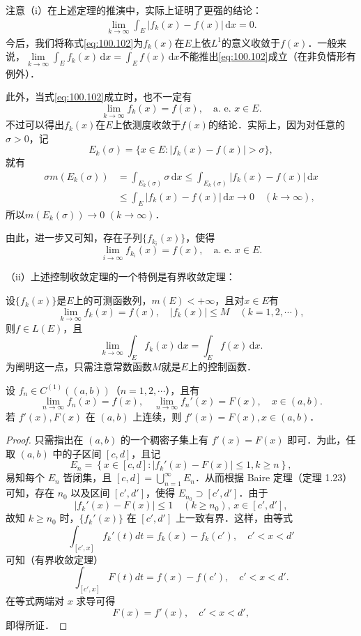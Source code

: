 \documentclass[../../main.tex]{subfiles}
\begin{document}
\begin{remark}
注意（i）在上述定理的推演中，实际上证明了更强的结论：
\begin{align}
\lim_{k \to \infty} \int_E |f_k(x) - f(x)| \, \mathrm{d}x = 0. \label{eq:100.102}
\end{align}
今后，我们将称式\eqref{eq:100.102}为\(f_k(x)\)在\(E\)上依\(L^1\)的意义收敛于\(f(x)\)．一般来说，$\underset{k\rightarrow \infty}{\lim}\int_E{f_k(x)\,\mathrm{d}x}=\int_E{f(x)\,\mathrm{d}x}$不能推出\eqref{eq:100.102}成立（在非负情形有例外）．

此外，当式\eqref{eq:100.102}成立时，也不一定有
\[
\lim_{k \to \infty} f_k(x) = f(x), \quad \text{a. e. } x \in E.
\]
不过可以得出\(f_k(x)\)在\(E\)上依测度收敛于\(f(x)\)的结论．实际上，因为对任意的\(\sigma > 0\)，记
\[
E_k(\sigma) = \{ x \in E : |f_k(x) - f(x)| > \sigma \},
\]
就有
\begin{align*}
\sigma m(E_k(\sigma)) &= \int_{E_k(\sigma)} \sigma \, \mathrm{d}x \leqslant \int_{E_k(\sigma)} |f_k(x) - f(x)| \, \mathrm{d}x \\
&\leqslant \int_E |f_k(x) - f(x)| \, \mathrm{d}x \to 0 \quad (k \to \infty),
\end{align*}
所以\(m(E_k(\sigma)) \to 0\) \((k \to \infty)\)．

由此，进一步又可知，存在子列\(\{ f_{k_i}(x) \}\)，使得
\[
\lim_{i \to \infty} f_{k_i}(x) = f(x), \quad \text{a. e. } x \in E.
\]

（ii）上述控制收敛定理的一个特例是有界收敛定理：

设\(\{ f_k(x) \}\)是\(E\)上的可测函数列，\(m(E) < +\infty\)，且对\(x \in E\)有
\[
\lim_{k \to \infty} f_k(x) = f(x), \quad |f_k(x)| \leqslant M \quad (k = 1, 2, \cdots),
\]
则\(f \in L(E)\)，且
\[
\lim_{k \to \infty} \int_E f_k(x) \, \mathrm{d}x = \int_E f(x) \, \mathrm{d}x.
\]
为阐明这一点，只需注意常数函数\(M\)就是\(E\)上的控制函数．
\end{remark}

\begin{example}
设 \( f_n \in C^{(1)}((a,b)) \)（\( n = 1,2,\cdots \)），且有
\[
\lim_{n \to \infty} f_n(x) = f(x), \quad \lim_{n \to \infty} f_n'(x) = F(x), \quad x \in (a,b).
\]
若 \( f'(x), F(x) \) 在 \( (a,b) \) 上连续，则 \( f'(x) = F(x), x \in (a,b) \)．
\end{example}
\begin{proof}
只需指出在 \( (a,b) \) 的一个稠密子集上有 \( f'(x) = F(x) \) 即可．为此，任取 \( (a,b) \) 中的子区间 \( [c,d] \)，且记
\[
E_n = \left\{ x \in [c,d] : |f_k'(x) - F(x)| \leqslant 1, k \geqslant n \right\},
\]
易知每个 \( E_n \) 皆闭集，且 \( [c,d] = \bigcup_{n=1}^{\infty} E_n \)．从而根据 Baire 定理（定理 1.23）可知，存在 \( n_0 \) 以及区间 \( [c',d'] \)，使得 \( E_{n_0} \supset [c',d'] \)．由于
\[
|f_k'(x) - F(x)| \leqslant 1 \quad (k \geqslant n_0), \, x \in [c',d'],
\]
故知 \( k \geqslant n_0 \) 时，\( \{ f_k'(x) \} \) 在 \( [c',d'] \) 上一致有界．这样，由等式
\[
\int_{[c',x]} f_k'(t) dt = f_k(x) - f_k(c'), \quad c' < x < d'
\]
可知（有界收敛定理）
\[
\int_{[c',x]} F(t) dt = f(x) - f(c'), \quad c' < x < d'.
\]
在等式两端对 \( x \) 求导可得
\[
F(x) = f'(x), \quad c' < x < d',
\]
即得所证．
\end{proof}
\end{document}
